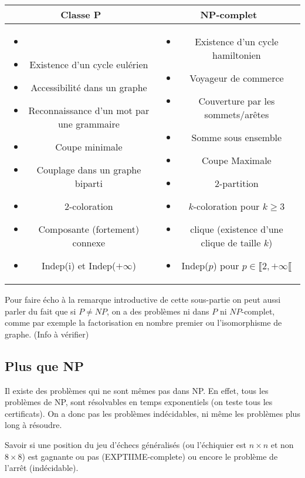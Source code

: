 \noindent\begin{tabular}{c|c}
	Classe P & NP-complet \\ \hline
	\begin{minipage}{0.45\linewidth}
		\begin{itemize}[label=$\bullet$]
			\item[]
			\item Existence d'un cycle eulérien
			\item Accessibilité dans un graphe
			\item Reconnaissance d'un mot par une grammaire
			\item Coupe minimale
			\item Couplage dans un graphe biparti
			\item 2-coloration
			\item Composante (fortement) connexe
			\item Indep(i) et Indep($+\infty$)
		\end{itemize}
	\end{minipage}
	&\begin{minipage}{0.45\linewidth}
		\begin{itemize}[label=$\bullet$]
			\item Existence d'un cycle hamiltonien
			\item Voyageur de commerce
			\item Couverture par les sommets/arêtes
			\item Somme sous ensemble
			\item Coupe Maximale
			\item 2-partition
			\item $k$-coloration pour $k\geq 3$
			\item clique (existence d'une clique de taille $k$)
			\item Indep($p$) pour $p \in \llbracket 2, +\infty \llbracket$
		\end{itemize}
	\end{minipage}
\end{tabular}

\begin{com}
	Pour faire écho à la remarque introductive de cette sous-partie on peut aussi parler du fait que si $P \neq NP$, on a des problèmes ni dans $P$ ni $NP$-complet, comme par exemple la factorisation en nombre premier ou l'isomorphisme de graphe. (Info à vérifier)
\end{com}

\subsection{Plus que NP}

Il existe des problèmes qui ne sont mêmes pas dans NP. En effet, tous les problèmes de NP, sont résolvables en temps exponentiels (on teste tous les certificats). On a donc pas les problèmes indécidables, ni même les problèmes plus long à résoudre.

\begin{example}
	Savoir si une position du jeu d'échecs généralisés (ou l'échiquier est $n \times n$ et non $8 \times 8$) est gagnante ou pas (EXPTIIME-complete) ou encore le problème de l'arrêt (indécidable).
\end{example}